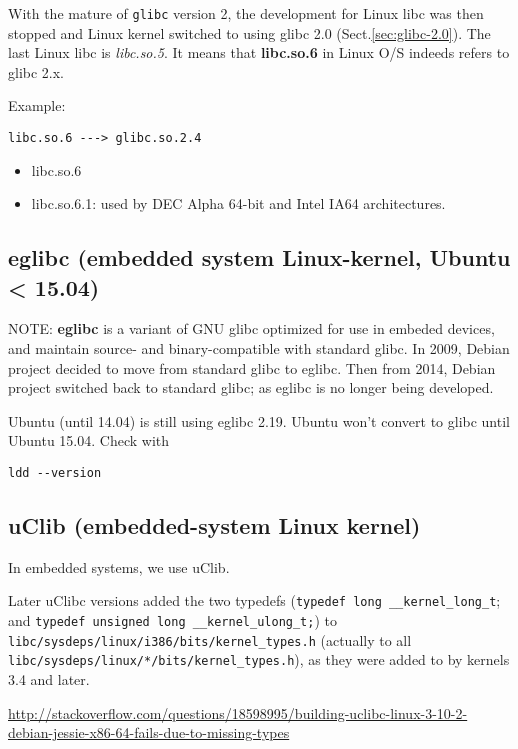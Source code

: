 With the mature of \verb!glibc! version 2, the development for Linux libc was
then stopped and Linux kernel switched to using glibc 2.0
(Sect.\ref{sec:glibc-2.0}). The last Linux libc is {\it libc.so.5}. It means
that {\bf libc.so.6} in Linux O/S indeeds refers to glibc 2.x.

Example:
\begin{verbatim}
libc.so.6 ---> glibc.so.2.4
\end{verbatim}

\begin{itemize}
  \item libc.so.6
  
  \item libc.so.6.1: used by DEC Alpha 64-bit and Intel IA64 architectures.
\end{itemize}

\subsection{eglibc (embedded system Linux-kernel, Ubuntu < 15.04)}
\label{sec:eglibc}

NOTE: {\bf eglibc} is a variant of GNU glibc optimized for use in embeded
devices, and maintain source- and binary-compatible with standard glibc. In
2009, Debian project decided to move from standard glibc to eglibc. Then from
2014, Debian project switched back to standard glibc; as eglibc is no longer
being developed.  

Ubuntu (until 14.04) is still using eglibc 2.19. Ubuntu won't convert to glibc
until Ubuntu 15.04. Check with
\begin{verbatim}
ldd --version
\end{verbatim}

\subsection{uClib (embedded-system Linux kernel)}
\label{sec:uClibc}

In embedded systems, we use uClib.

Later uClibc versions added the two typedefs (\verb!typedef long __kernel_long_t!; and
\verb!typedef unsigned long __kernel_ulong_t;!) to
\verb!libc/sysdeps/linux/i386/bits/kernel_types.h! (actually to all
\verb!libc/sysdeps/linux/*/bits/kernel_types.h!), as they were added to by kernels 3.4
and later.


\url{http://stackoverflow.com/questions/18598995/building-uclibc-linux-3-10-2-debian-jessie-x86-64-fails-due-to-missing-types}

